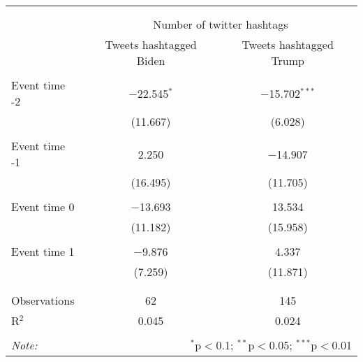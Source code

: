 
\begin{table}[h] \centering 
  \caption{} 
  \label{tab:es_reg_results} 
\begin{tabular}{@{\extracolsep{5pt}}lcc} 
\\[-1.8ex]\hline 
\hline \\[-1.8ex] 
\\[-1.8ex] & \multicolumn{2}{c}{Number of twitter hashtags} \\ 
 & Tweets hashtagged Biden & Tweets hashtagged Trump \\ 
\hline \\[-1.8ex] 
 Event time -2 & $-$22.545$^{*}$ & $-$15.702$^{***}$ \\ 
  & (11.667) & (6.028) \\ 
  & & \\ 
 Event time -1 & 2.250 & $-$14.907 \\ 
  & (16.495) & (11.705) \\ 
  & & \\ 
 Event time 0 & $-$13.693 & 13.534 \\ 
  & (11.182) & (15.958) \\ 
  & & \\ 
 Event time 1 & $-$9.876 & 4.337 \\ 
  & (7.259) & (11.871) \\ 
  & & \\ 
\hline \\[-1.8ex] 
Observations & 62 & 145 \\ 
R$^{2}$ & 0.045 & 0.024 \\ 
\hline 
\hline \\[-1.8ex] 
\textit{Note:}  & \multicolumn{2}{r}{$^{*}$p$<$0.1; $^{**}$p$<$0.05; $^{***}$p$<$0.01} \\ 
\end{tabular} 
\end{table} 
